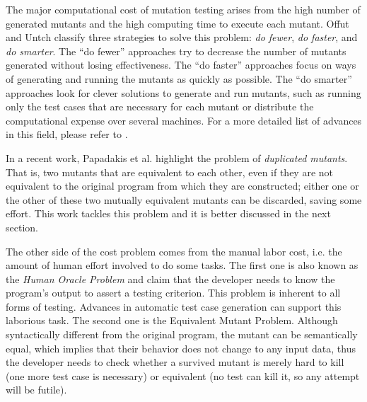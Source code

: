 The major computational cost of mutation testing arises from the high number of generated mutants and the high computing time to execute each mutant.
Offut and Untch \cite{OFFUTT:2001:1} classify three strategies to solve this problem: \textit{do fewer}, \textit{do faster}, and \textit{do smarter}. 
The ``do fewer'' approaches try to decrease the number of mutants generated without losing effectiveness. 
The ``do faster'' approaches focus on ways of generating and running the mutants as quickly as possible. 
The ``do smarter'' approaches look for clever solutions to generate and run mutants, such as running only the test cases that are necessary for each mutant or distribute the computational expense over several machines. 
For a more detailed list of advances in this field, please refer to \cite{JIA:2011:1, OFFUTT:2001:1}.


In a recent work, Papadakis et al. \cite{PAPADAKIS:2015:1} highlight the problem of \textit{duplicated mutants}. 
That is, two mutants that are equivalent to each other, even if they are not equivalent to the original program from which they are constructed; either one or the other of these two mutually equivalent mutants can be discarded, saving some effort. 
This work tackles this problem and it is better discussed in the next section.

The other side of the cost problem comes from the manual labor cost, i.e. the amount of human effort involved to do some tasks. 
The first one is also known as the \textit{Human Oracle Problem} and claim that the developer needs to know the program's output to assert a testing criterion. 
This problem is inherent to all forms of testing. 
Advances in automatic test case generation can support this laborious task. 
The second one is the Equivalent Mutant Problem. 
Although syntactically different from the original program, the mutant can be semantically equal, which implies that their behavior does not change to any input data, thus the developer needs to check whether a survived mutant is merely hard to kill (one more test case is necessary) or equivalent (no test can kill it, so any attempt will be futile).

